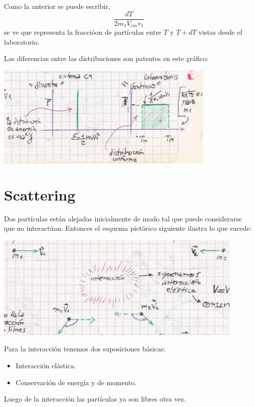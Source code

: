 \documentclass[10pt,oneside]{CBFT_book}
\begin{document}
Como la anterior se puede escribir,
\[
	\frac{dT}{2 m_1 V_{cm} v_1}
\]
se ve que representa la fraccióon de partículas entre $T$ y $T+dT$ vistas desde el laboratorio.

Las diferencias entre las distribuciones son patentes en este gráfico:

\includegraphics[scale=0.4]{images/fig_mc_dispersion_distribuciones.jpg}

\section{Scattering}

Dos partículas están alejadas inicialmente de modo tal que puede considerarse que no interactúan.
Entonces el esquema pictórico siguiente ilustra lo que sucede:

\includegraphics[scale=0.4]{images/fig_mc_dispersion_picture.jpg}

Para la interacción tenemos dos suposiciones básicas:
	\begin{itemize}
		\item Interacción elástica.
		\item Conservación de energía y de momento.
	\end{itemize}

Luego de la interacción las partículas ya son libres otra vez.
	
\end{document}
